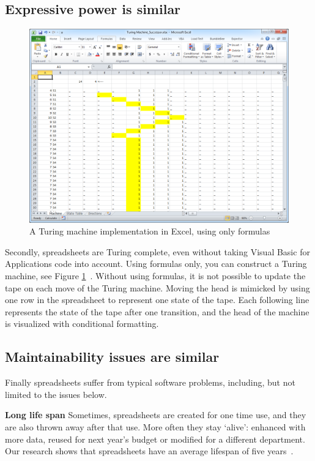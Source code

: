 \documentclass[conference]{IEEEtran}
\begin{document}
\subsection{Expressive power is similar}

\begin{figure}
  \begin{center}
  \includegraphics[width=\columnwidth]{fig/turing.png}
  \caption{A Turing machine implementation in Excel, using only formulas}
  \label{fig:visical}
  \end{center}
\end{figure} 

Secondly, spreadsheets are Turing complete, even without taking Visual Basic for Applications code into account. Using formulas only, you can construct a Turing machine, see Figure \ref{fig:visical}~\cite{Turing2013}. Without using formulas, it is not possible to update the tape on each move of the Turing machine. Moving the head is mimicked by using one row in the spreadsheet to represent one state of the tape. Each following line represents the state of the tape after one transition, and the head of the machine is visualized with conditional formatting.

\subsection{Maintainability issues are similar}

Finally spreadsheets suffer from typical software problems, including, but not limited to the issues below.

\textbf{Long life span} Sometimes, spreadsheets are created for one time use, and they are also thrown away after that use. More often they stay ‘alive’: enhanced with more data, reused for next year's budget or modified for a different department. Our research shows that spreadsheets have an average lifespan of five years~\cite{hermans_supporting_2011}.
\end{document}
